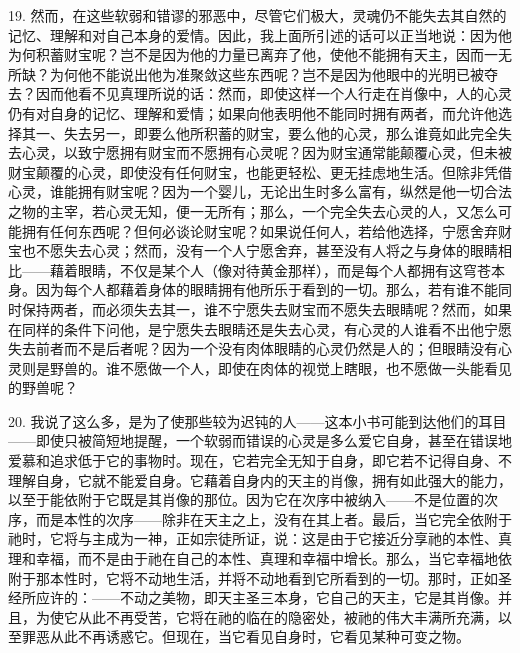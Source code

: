 19. 然而，在这些软弱和错谬的邪恶中，尽管它们极大，灵魂仍不能失去其自然的记忆、理解和对自己本身的爱情。因此，我上面所引述的话可以正当地说：因为他为何积蓄财宝呢？岂不是因为他的力量已离弃了他，使他不能拥有天主，因而一无所缺？为何他不能说出他为准聚敛这些东西呢？岂不是因为他眼中的光明已被夺去？因而他看不见真理所说的话：然而，即使这样一个人行走在肖像中，人的心灵仍有对自身的记忆、理解和爱情；如果向他表明他不能同时拥有两者，而允许他选择其一、失去另一，即要么他所积蓄的财宝，要么他的心灵，那么谁竟如此完全失去心灵，以致宁愿拥有财宝而不愿拥有心灵呢？因为财宝通常能颠覆心灵，但未被财宝颠覆的心灵，即使没有任何财宝，也能更轻松、更无挂虑地生活。但除非凭借心灵，谁能拥有财宝呢？因为一个婴儿，无论出生时多么富有，纵然是他一切合法之物的主宰，若心灵无知，便一无所有；那么，一个完全失去心灵的人，又怎么可能拥有任何东西呢？但何必谈论财宝呢？如果说任何人，若给他选择，宁愿舍弃财宝也不愿失去心灵；然而，没有一个人宁愿舍弃，甚至没有人将之与身体的眼睛相比——藉着眼睛，不仅是某个人（像对待黄金那样），而是每个人都拥有这穹苍本身。因为每个人都藉着身体的眼睛拥有他所乐于看到的一切。那么，若有谁不能同时保持两者，而必须失去其一，谁不宁愿失去财宝而不愿失去眼睛呢？然而，如果在同样的条件下问他，是宁愿失去眼睛还是失去心灵，有心灵的人谁看不出他宁愿失去前者而不是后者呢？因为一个没有肉体眼睛的心灵仍然是人的；但眼睛没有心灵则是野兽的。谁不愿做一个人，即使在肉体的视觉上瞎眼，也不愿做一头能看见的野兽呢？\par

20. 我说了这么多，是为了使那些较为迟钝的人——这本小书可能到达他们的耳目——即使只被简短地提醒，一个软弱而错误的心灵是多么爱它自身，甚至在错误地爱慕和追求低于它的事物时。现在，它若完全无知于自身，即它若不记得自身、不理解自身，它就不能爱自身。它藉着自身内的天主的肖像，拥有如此强大的能力，以至于能依附于它既是其肖像的那位。因为它在次序中被纳入——不是位置的次序，而是本性的次序——除非在天主之上，没有在其上者。最后，当它完全依附于祂时，它将与主成为一神，正如宗徒所证，说：这是由于它接近分享祂的本性、真理和幸福，而不是由于祂在自己的本性、真理和幸福中增长。那么，当它幸福地依附于那本性时，它将不动地生活，并将不动地看到它所看到的一切。那时，正如圣经所应许的：——不动之美物，即天主圣三本身，它自己的天主，它是其肖像。并且，为使它从此不再受苦，它将在祂的临在的隐密处，被祂的伟大丰满所充满，以至罪恶从此不再诱惑它。但现在，当它看见自身时，它看见某种可变之物。\par


